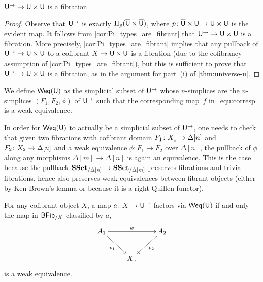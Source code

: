 \documentclass[reqno,10pt,a4paper,oneside,draft]{amsart}
\begin{document}
\begin{lemma} $\mathsf{U}^{\rightarrow} \rightarrow \mathsf{U} \times \mathsf{U}$ is a fibration
\end{lemma}

\begin{proof} Observe that $\mathsf{U}^{\rightarrow}$ is exactly $\Pi_p(\overline{\mathsf{U}} \times \overline{\mathsf{U}})$, 
where $p \colon \overline{\mathsf{U}} \times \mathsf{U} \rightarrow \mathsf{U} \times \mathsf{U}$ is the evident map. 
It follows from \cref{cor:Pi_types_are_fibrant} that $\mathsf{U}^{\rightarrow} \rightarrow \mathsf{U} \times \mathsf{U}$ is a fibration.
More precisely, \cref{cor:Pi_types_are_fibrant} implies that any pullback of  $\mathsf{U}^{\rightarrow} \rightarrow \mathsf{U} \times \mathsf{U}$ to a cofibrant
$X \rightarrow \mathsf{U} \times \mathsf{U}$ is a fibration (due to the cofibrancy assumption of  \cref{cor:Pi_types_are_fibrant}),
but this is sufficient to prove that $\mathsf{U}^{\rightarrow} \rightarrow \mathsf{U} \times \mathsf{U}$ is a fibration,
as in the argument for part~(i) of  \cref{thm:universe-u}.
\end{proof}


We define $\mathsf{Weq}(\mathsf{U})$ as the simplicial subset of $\mathsf{U}^\to$ whose $n$-simplices are the $n$-simplices $(F_1, F_2, \phi)$ of $\mathsf{U}^\to$ such that the corresponding map~$f$ in~\eqref{equ:corresp} is a weak equivalence.


In order for $\mathsf{Weq}(\mathsf{U})$ to actually be a simplicial subset of $\mathsf{U}^{\to}$, one needs to check that given two fibrations with cofibrant domain $F_1 \colon X_1 \rightarrow \Delta[n]$ and $F_2 \colon X_2 \rightarrow \Delta[n]$ and a weak equivalence $\phi:F_1 \rightarrow F_2$ over $\Delta[n]$, the pullback of $\phi$ along any morphisms $\Delta[m] \rightarrow \Delta[n]$ is again an equivalence. This is the case because the pullback  $\mathbf{SSet}_{/\Delta[n]} \rightarrow \mathbf{SSet}_{/\Delta[m]}$ preserves fibrations and trivial fibrations, hence also preserves weak equivalences between fibrant objects (either by Ken Brown's lemma or because it is a right Quillen functor).



\begin{lemma}
\label{prop:Weq_classify_Weq}
For any cofibrant object $X$, a map $a \colon X \rightarrow \mathsf{U}^{\rightarrow}$ factors via 
 $\mathsf{Weq}(\mathsf{U})$ if and only the map in $\mathsf{BFib}_{/X}$ classified by $a$,
\[
\xymatrix{
A_1 \ar[rr]^w  \ar[dr]_{p_1} & & A_2 \ar[dl]^{p_2} \\
 & X \, , & }
 \]
is a weak equivalence.
\end{lemma}
\end{document}
